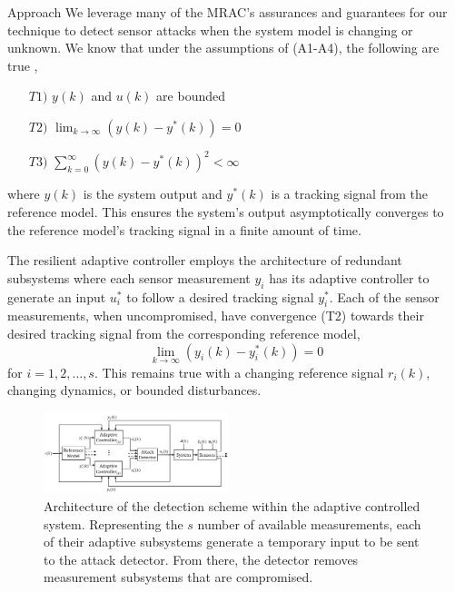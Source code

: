 \begin{section}{Approach}
We leverage many of the MRAC's assurances and guarantees for our technique to detect sensor attacks when the system model is changing or unknown. We know that under the assumptions of (A1-A4), the following are true \cite{tao2003adaptive},
	\begin{enumerate}[label=(\roman*),leftmargin=3\parindent]
	\label{assumtions_ensure}
	\item[$T1)$] $y(k)$ and $u(k)$ are bounded 
	\item[$T2)$] $\lim_{k\to\infty}(y(k)-y^*(k))=0$
	\label{Truth2}
	\item[$T3)$] $\sum_{k=0}^\infty(y(k)-y^*(k))^2<\infty$
	\end{enumerate}
where $y(k)$ is the system output and $y^*(k)$ is a tracking signal from the reference model. This ensures the system's output asymptotically converges to the reference model's tracking signal in a finite amount of time. 

The resilient adaptive controller employs the architecture of redundant subsystems where each sensor measurement $y_i$ has its adaptive controller to generate an input $u^*_i$ to follow a desired tracking signal $y^*_i$. Each of the sensor measurements, when uncompromised, have convergence (T2) towards their desired tracking signal from the corresponding reference model,
    \begin{equation}
    \label{multiple_output_tracking}
    \lim_{k\to\infty}(y_i(k)-y^*_i(k))=0
    \end{equation}
for $i=1,2,\dots,s$. This remains true with a changing reference signal $r_i(k)$, changing dynamics, or bounded disturbances. 

\begin{figure}[ht!]
\vspace{1pt}
\centering
\includegraphics[width=0.48\textwidth]{con_and_det.png}
\caption{Architecture of the detection scheme within the adaptive controlled system. Representing  the $s$ number of available measurements, each of their adaptive subsystems generate a temporary input to be sent to the attack detector. From there, the detector removes measurement subsystems that are compromised.}
\label{fig:det_arch}
\end{figure}


\end{section}
